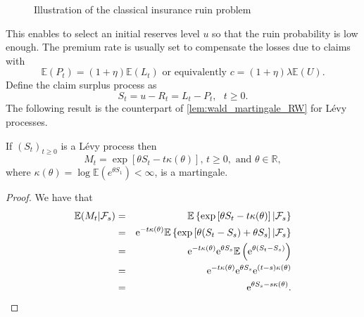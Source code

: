 \begin{figure} 
\begin{center}
\end{center}
\label{fig:ruin_time_CL}
\caption{Illustration of the classical insurance ruin problem}
\end{figure}
This enables to select an initial reserves level $u$ so that the ruin probability is low enough. The premium rate is usually set to compensate the losses due to claims with 
$$
\mathbb{E}(P_t) = (1+\eta)\mathbb{E}(L_t)\text{ or  equivalently } c = (1+\eta)\lambda\mathbb{E}(U).
$$
Define the claim surplus process as
$$
S_t = u - R_t = L_t-P_t,\text{ }t\geq 0.
$$
The following result is the counterpart of \cref{lem:wald_martingale_RW} for Lévy processes.
\begin{prop}\label{prop:wald_martingale_levy}
If $(S_t)_{t\geq0}$ is a L\'evy process then
$$
M_t = \exp\left[\theta S_t-t\kappa(\theta)\right]\text{, }t\geq0,\text{ and }\theta\in \mathbb{R}, 
$$
where $\kappa(\theta)=\log\mathbb{E}\left(e^{\theta S_1}\right)<\infty$, is a martingale.
\begin{proof}
We have that 
\begin{eqnarray*}
\mathbb{E}(M_t|\mathcal{F}_s) &=&\mathbb{E}\left\{\exp\left[\theta S_t-t\kappa(\theta)\right]|\mathcal{F}_s\right\} \\
&=&\mathrm{e}^{-t\kappa(\theta)}\mathbb{E}\left\{\exp\left[\theta (S_t-S_s) + \theta S_s\right]|\mathcal{F}_s\right\}\\
&=&\mathrm{e}^{-t\kappa(\theta)}\mathrm{e}^{\theta S_s}\mathbb{E}\left(\mathrm{e}^{\theta (S_t-S_s)}\right)\\
&=&\mathrm{e}^{-t\kappa(\theta)}\mathrm{e}^{\theta S_s}\mathrm{e}^{(t-s)\kappa(\theta)}\\
&=&\mathrm{e}^{\theta S_s -s\kappa(\theta)}.
\end{eqnarray*}
\end{proof}
\end{prop}

